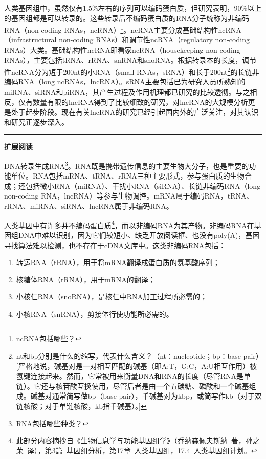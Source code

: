 \documentclass[11pt,a4paper,twoside]{book}
\begin{document}
人类基因组中，虽然仅有1.5\%左右的序列可以编码蛋白质，但研究表明，90\%以上的基因组都是可以转录的。这些转录后不编码蛋白质的RNA分子统称为非编码RNA（non-coding RNAs，ncRNA）\footnote{ncRNA包括哪些？}。ncRNA主要分成基础结构性ncRNA（infrastructural non-coding RNAs）和调节性ncRNA（regulatory non-coding RNAs）大类。基础结构性ncRNA即看家ncRNA（housekeeping non-coding RNAs），主要包括tRNA、rRNA、snRNA和snoRNA。根据转录本的长度，调节性ncRNA分为短于200nt的小RNA（small RNAs，sRNA）和长于200nt\footnote{nt和bp分别是什么的缩写，代表什么含义？（nt：nucleotide；bp：base pair）[严格地说，碱基对是一对相互匹配的碱基（即A:T，G:C，A:U相互作用）被氢键连接起来。然而，它常被用来衡量DNA和RNA的长度（尽管RNA是单链）。它还与核苷酸互换使用，尽管后者是由一个五碳糖、磷酸和一个碱基组成。碱基对通常简写做bp（base pair），千碱基对为kbp，或简写作kb（对于双链核酸；对于单链核酸，kb指千碱基）。]}的长链非编码RNA（long ncRNAs，lncRNA）。sRNA主要包括已为研究人员所熟知的miRNA、siRNA和piRNA，其产生过程及作用机理都已研究的比较透彻。与之相反，仅有数量有限的lncRNA得到了比较细致的研究，对lncRNA的大规模分析更是处于起步阶段。现在有关lncRNA的研究已经引起国内外的广泛关注，对其认识和研究正逐步深入。

\vspace{0.5cm}
\hrule height 3pt

\noindent
{\large \bfseries \HandPencilLeft 扩展阅读}

{\small
DNA转录生成RNA\footnote{RNA包括哪些种类？}。RNA既是携带遗传信息的主要生物大分子，也是重要的功能单位。RNA包括mRNA、tRNA、rRNA三种主要形式，参与蛋白质的生物合成；还包括微小RNA（miRNA）、干扰小RNA（siRNA）、长链非编码RNA（long non-coding RNA，lncRNA）等参与生物调控。mRNA属于编码RNA，tRNA、rRNA、miRNA、siRNA、lncRNA属于非编码RNA。

人类基因中有许多并不编码蛋白质\footnote{此部分内容摘抄自《生物信息学与功能基因组学》（乔纳森\textbullet 佩夫斯纳\ 著，孙之荣\ 译），第3篇\ 基因组分析，第17章\ 人类基因组，17.4\ 人类基因组计划。}，而以非编码RNA为其产物。非编码RNA在基因组DNA中难以识别，因为它们较短小、缺乏开放阅读框、也没有poly(A)，基因寻找算法难以检测，也不存在于cDNA文库中。这类非编码RNA包括：
\begin{enumerate}
  \item 转运RNA（tRNA），用于将mRNA翻译成蛋白质的氨基酸序列；
  \item 核糖体RNA（rRNA），用于mRNA的翻译；
  \item 小核仁RNA（snoRNA），是核仁中RNA加工过程所必需的；
  \item 小核RNA（snRNA），剪接体行使功能所必需的。
\end{enumerate}
}
\end{document}
